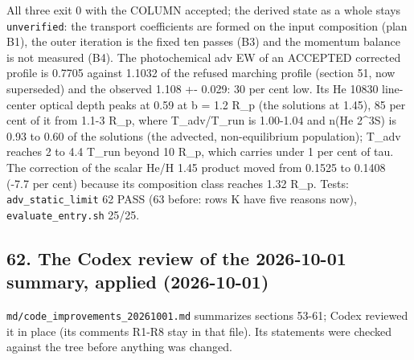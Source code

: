 \documentclass[english,a4paper]{my_memo}
\begin{document}
All three exit 0 with the COLUMN accepted; the derived state as a whole
stays \texttt{unverified}: the transport coefficients are formed on the input
composition (plan B1), the outer iteration is the fixed ten passes (B3)
and the momentum balance is not measured (B4). The
photochemical adv EW of an ACCEPTED corrected profile is 0.7705 against
1.1032 of the refused marching profile (section 51, now superseded) and
the observed 1.108 +- 0.029: 30 per cent low. Its He 10830 line-center
optical depth peaks at 0.59 at b = 1.2 R\_p (the solution\textquotesingle s at 1.45), 85 per
cent of it from 1.1-3 R\_p, where T\_adv/T\_run is 1.00-1.04 and n(He 2\^{}3S)
is 0.93 to 0.60 of the solution\textquotesingle s (the advected, non-equilibrium
population); T\_adv reaches 2 to 4.4 T\_run beyond 10 R\_p, which carries
under 1 per cent of tau. The correction of the scalar He/H 1.45 product
moved from 0.1525 to 0.1408 (-7.7 per cent) because its composition class
reaches 1.32 R\_p. Tests: \texttt{adv\_static\_limit} 62 PASS (63 before: rows K
have five reasons now), \texttt{evaluate\_entry.sh} 25/25.

\subsection{62. The Codex review of the 2026-10-01 summary, applied (2026-10-01)}\label{62-the-codex-review-of-the-2026-10-01-summary-applied-2026-10-01}

\texttt{md/code\_improvements\_20261001.md} summarizes sections 53-61; Codex
reviewed it in place (its comments R1-R8 stay in that file). Its
statements were checked against the tree before anything was changed.
\end{document}

